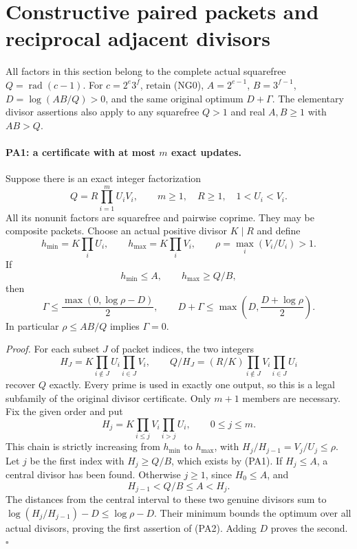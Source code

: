 \section{Constructive paired packets and reciprocal adjacent divisors}
\label{sec-pa18-paired-packets}

All factors in this section belong to the complete actual squarefree
$Q=\operatorname{rad}(c-1)$. For $c=2^e3^f$, retain (NG0),
$A=2^{e-1}$, $B=3^{f-1}$, $D=\log(AB/Q)>0$, and the same original
optimum $D+\Gamma$. The elementary divisor assertions also apply to
any squarefree $Q>1$ and real $A,B\geq1$ with $AB>Q$.

\paragraph{PA1: a certificate with at most $m$ exact updates.}
Suppose there is an exact integer factorization
\[
 Q=R\prod_{i=1}^mU_iV_i,\qquad m\geq1,\quad
 R\geq1,\quad 1<U_i<V_i.
\]
All its nonunit factors are squarefree and pairwise coprime. They
may be composite packets. Choose an actual positive divisor $K\mid R$
and define
\[
 h_{\min}=K\prod_iU_i,\qquad h_{\max}=K\prod_iV_i,
 \qquad \rho=\max_i(V_i/U_i)>1.
\]
If
\[
 h_{\min}\leq A,\qquad h_{\max}\geq Q/B,              \tag{PA1}
\]
then
\[
 \Gamma\leq\frac{\max(0,\log\rho-D)}2,\qquad
 D+\Gamma\leq\max\left(D,\frac{D+\log\rho}{2}\right).
                                                               \tag{PA2}
\]
In particular $\rho\leq AB/Q$ implies $\Gamma=0$.

\emph{Proof.} For each subset $J$ of packet indices, the two integers
\[
 H_J=K\prod_{i\notin J}U_i\prod_{i\in J}V_i,\qquad
 Q/H_J=(R/K)\prod_{i\notin J}V_i\prod_{i\in J}U_i
\]
recover $Q$ exactly. Every prime is used in exactly one output, so
this is a legal subfamily of the original divisor certificate.
Only $m+1$ members are necessary. Fix the given order and put
\[
 H_j=K\prod_{i\leq j}V_i\prod_{i>j}U_i,
             \qquad 0\leq j\leq m.
\]
This chain is strictly increasing from $h_{\min}$ to $h_{\max}$,
with $H_j/H_{j-1}=V_j/U_j\leq\rho$. Let $j$ be the first index
with $H_j\geq Q/B$, which exists by (PA1). If $H_j\leq A$, a
central divisor has been found. Otherwise $j\geq1$, since
$H_0\leq A$, and
\[
 H_{j-1}<Q/B\leq A<H_j.
\]
The distances from the central interval to these two genuine
divisors sum to $\log(H_j/H_{j-1})-D\leq\log\rho-D$.
Their minimum bounds the optimum over all actual divisors, proving
the first assertion of (PA2). Adding $D$ proves the second. $\square$

